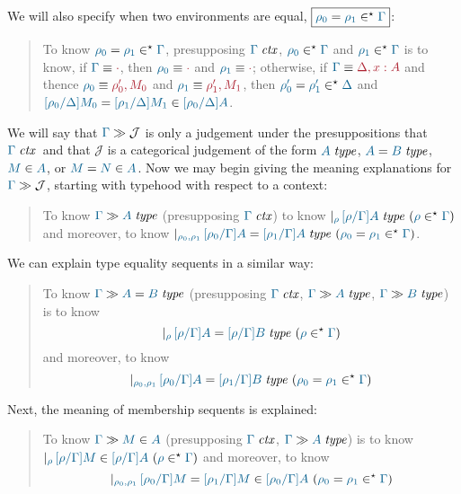 We will also specify when two environments are equal,
$\framebox{\eqenv{\rho_0}{\rho_1}{\Gamma}}$:
\begin{quote}
  To know $\eqenv{\rho_0}{\rho_1}{\Gamma}$, presupposing $\isctx{\Gamma}$,
  $\isenv{\rho_0}{\Gamma}$ and $\isenv{\rho_1}{\Gamma}$ is to know, if
  $\Match{\Gamma}{\cdot}$, then $\Match{\rho_0}{\cdot}$ and
  $\Match{\rho_1}{\cdot}$; otherwise, if $\Match{\Gamma}{\Delta,x:A}$ and
  thence $\Match{\rho_0}{\rho_0',M_0}$ and $\Match{\rho_1}{\rho_1',M_1}$, then
  $\eqenv{\rho_0'}{\rho_1'}{\Delta}$ and
  $\ever{[\rho_0/\Delta]M_0}{[\rho_1/\Delta]M_1}{[\rho_0/\Delta]A}$.
\end{quote}

We will say that $\sequent{\Gamma}{\mathcal{J}}$ is only a judgement under the
presuppositions that $\isctx\Gamma$\ and that $\mathcal{J}$ is a categorical
judgement of the form $\isset{A}$, $\eisset{A}{B}$, $\ver{M}{A}$, or
$\ever{M}{N}{A}$.  Now we may begin giving the meaning explanations for
$\sequent{\Gamma}{\mathcal{J}}$, starting with typehood with respect to a
context:

\begin{quote}
  To know $\sequent{\Gamma}{\isset{A}}$ (presupposing $\isctx\Gamma$) to know
  $
    \genj{\rho}{
      \hyp{
        \isset{[\rho/\Gamma]A}
      }{
        \isenv{\rho}{\Gamma}
      }
    }
  $
  and moreover, to know
  $
    \genj{\rho_0,\rho_1}{
      \hyp{
        \eisset{[\rho_0/\Gamma]A}{[\rho_1/\Gamma]A}
      }{
        \eqenv{\rho_0}{\rho_1}{\Gamma}
      }
    }
  $.
\end{quote}

We can explain type equality sequents in a similar way:

\begin{quote}

  To know $\sequent{\Gamma}{\eisset{A}{B}}$ (presupposing $\isctx\Gamma$,
  $\sequent{\Gamma}{\isset{A}}$, $\sequent{\Gamma}{\isset{B}}$) is to know
  \[
    \genj{\rho}{
      \hyp{
        \eisset{[\rho/\Gamma]A}{[\rho/\Gamma]B}
      }{
        \isenv{\rho}{\Gamma}
      }
    }
  \]
  and moreover, to know
  \[
    \genj{\rho_0,\rho_1}{
      \hyp{
        \eisset{[\rho_0/\Gamma]A}{[\rho_1/\Gamma]B}
      }{
        \eqenv{\rho_0}{\rho_1}{\Gamma}
      }
    }
  \]
\end{quote}

Next, the meaning of membership sequents is explained:

\begin{quote}
  To know $\sequent{\Gamma}{\ver{M}{A}}$ (presupposing $\isctx\Gamma$, $\sequent{\Gamma}{\isset{A}}$) is to know
  $
    \genj{\rho}{
      \hyp{
        \ver{[\rho/\Gamma]M}{[\rho/\Gamma]A}
      }{
        \isenv{\rho}{\Gamma}
      }
    }
  $
  and moreover, to know
  \[
    \genj{\rho_0,\rho_1}{
      \hyp{
        \ever{[\rho_0/\Gamma]M}{[\rho_1/\Gamma]M}{[\rho_0/\Gamma]A}
      }{
        \eqenv{\rho_0}{\rho_1}{\Gamma}
      }
    }
  \]
\end{quote}

